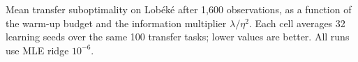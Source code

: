 Mean transfer suboptimality on Lobéké after 1,600 observations, as a function of the warm-up budget and the information multiplier $\lambda/\eta^2$. Each cell averages 32 learning seeds over the same 100 transfer tasks; lower values are better. All runs use MLE ridge $10^{-6}$.
